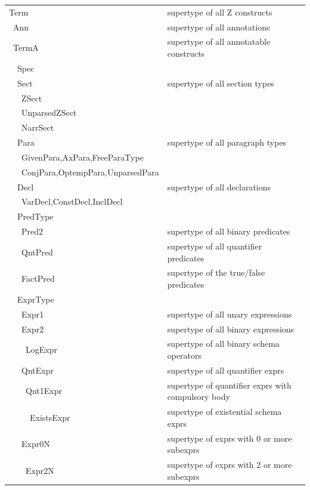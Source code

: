 \documentclass[%
   slidesonly,%
   semhelv,%
   landscape]{seminar}
\begin{document}
\begin{slide}
\newcommand{\I}{\hbox{\ \qquad}}
\newcommand{\NL}{\\[-1ex]}
\begin{scriptsize}
\begin{tabular}{ll}
Term                      &supertype of all Z constructs \NL
\I Ann                    &supertype of all annotations\NL
\I TermA                  &supertype of all annotatable constructs\NL
\I\I  Spec                &\NL
\I\I  Sect                &supertype of all section types \NL
\I\I\I  ZSect             &\NL
\I\I\I  UnparsedZSect     &\NL
\I\I\I  NarrSect          &\NL
\I\I  Para                &supertype of all paragraph types\NL
\I\I\I  GivenPara,AxPara,FreeParaType\NL
\I\I\I  ConjPara,OptempPara,UnparsedPara\NL
\I\I  Decl                &supertype of all declarations\NL
\I\I\I  VarDecl,ConstDecl,InclDecl\NL
\I\I  PredType\NL
\I\I\I  Pred2             &supertype of all binary predicates\NL
\I\I\I  QntPred           &supertype of all quantifier predicates\NL
\I\I\I  FactPred          &supertype of the true/false predicates\NL
\I\I  ExprType\NL
\I\I\I  Expr1             &supertype of all unary expressions\NL
\I\I\I  Expr2             &supertype of all binary expressions\NL
\I\I\I\I  LogExpr         &supertype of all binary schema operators\NL
\I\I\I  QntExpr           &supertype of all quantifier exprs\NL
\I\I\I\I  Qnt1Expr        &supertype of quantifier exprs with compulsory body\NL
\I\I\I\I\I  ExistsExpr     &supertype of existential schema exprs\NL
\I\I\I  Expr0N            &supertype of exprs with 0 or more subexprs\NL
\I\I\I\I  Expr2N          &supertype of exprs with 2 or more subexprs\NL
\end{tabular}
\end{scriptsize}
\end{slide}
\end{document}
